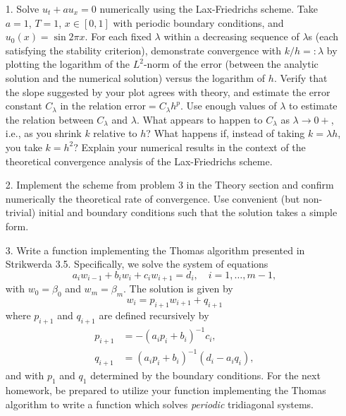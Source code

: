 \documentclass{article}
\begin{document}
\begin{itemize}

\item[1.] Solve $u_t + a u_x = 0$ numerically using the Lax-Friedrichs scheme. Take $a = 1$, $T = 1$, $x \in [0,1]$ with periodic boundary conditions, and $u_0(x) = \sin 2 \pi x$. For each fixed $\lambda$ within a decreasing sequence of $\lambda$s (each satisfying the stability criterion), demonstrate convergence with $k/h =: \lambda$ by plotting the logarithm of the $L^2$-norm of the error (between the analytic solution and the numerical solution) versus the logarithm of $h$. Verify that the slope suggested by your plot agrees with theory, and estimate the error constant $C_{\lambda}$ in the relation $\text{error} = C_{\lambda} h^p$. Use enough values of $\lambda$ to estimate the relation between $C_{\lambda}$ and $\lambda$. What appears to happen to $C_{\lambda}$ as $\lambda \to 0+$, i.e., as you shrink $k$ relative to $h$? What happens if, instead of taking $k = \lambda h$, you take $k = h^2$? Explain your numerical results in the context of the theoretical convergence analysis of the Lax-Friedrichs scheme.

\item[2.] Implement the scheme from problem 3 in the Theory section and confirm numerically the theoretical rate of convergence. Use convenient (but non-trivial) initial and boundary conditions such that the solution takes a simple form.

\item[3.] Write a function implementing the Thomas algorithm presented in Strikwerda 3.5. Specifically, we solve the system of equations
\begin{equation*}
a_i w_{i-1} + b_i w_i + c_i w_{i+1} = d_i, \quad i = 1, \dotsc, m-1,
\end{equation*}
with $w_0 = \beta_0$ and $w_m = \beta_m$. The solution is given by
\begin{equation*}
w_i = p_{i+1} w_{i+1} + q_{i+1}
\end{equation*}
where $p_{i+1}$ and $q_{i+1}$ are defined recursively by
\begin{align*}
p_{i+1} & = -\left( a_i p_i + b_i \right)^{-1} c_i, \\
q_{i+1} & = \left( a_i p_i + b_i \right)^{-1} \left( d_i - a_i q_i \right),
\end{align*}
and with $p_1$ and $q_1$ determined by the boundary conditions. For the next homework, be prepared to utilize your function implementing the Thomas algorithm to write a function which solves \emph{periodic} tridiagonal systems.

\end{itemize}
\end{document}
